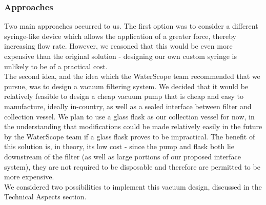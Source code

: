 \documentclass[12pt]{article}
\begin{document}
\subsubsection{Approaches}
Two main approaches occurred to us. The first option was to consider a different syringe-like device which allows the application of a greater force, thereby increasing flow rate. However, we reasoned that this would be even more expensive than the original solution - designing our own custom syringe is unlikely to be of a practical cost.\\
The second idea, and the idea which the WaterScope team recommended that we pursue, was to design a vacuum filtering system. We decided that it would be relatively feasible to design a cheap vacuum pump that is cheap and easy to manufacture, ideally in-country, as well as a sealed interface between filter and collection vessel. We plan to use a glass flask as our collection vessel for now, in the understanding that modifications could be made relatively easily in the future by the WaterScope team if a glass flask proves to be impractical. The benefit of this solution is, in theory, its low cost - since the pump and flask both lie downstream of the filter (as well as large portions of our proposed interface system), they are not required to be disposable and therefore are permitted to be more expensive.\\
We considered two possibilities to implement this vacuum design, discussed in the Technical Aspects section.
\end{document}
